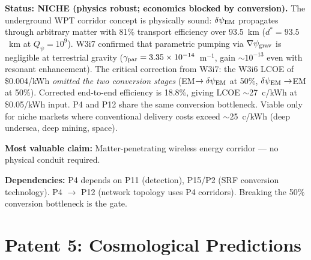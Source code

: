 \documentclass[11pt]{article}
\newcommand{\ee}[1]{\times 10^{#1}}
\newcommand{\psigrav}{\psi_{\rm grav}}
\newcommand{\dpsiEM}{\delta\psi_{\rm EM}}
\begin{document}
\begin{tcolorbox}[colback=yellow!5!white, colframe=yellow!60!black,
  title=\textbf{P4: NICHE --- Resource Allocation: 2/5}]
\textbf{Status: NICHE (physics robust; economics blocked by conversion).}
The underground WPT corridor concept is physically sound: $\dpsiEM$
propagates through arbitrary matter with 81\% transport efficiency over
93.5~km ($d^* = 93.5$~km at $Q_\psi = 10^9$). W3i7 confirmed that
parametric pumping via $\nabla\psigrav$ is negligible at terrestrial
gravity ($\gamma_{\rm par} = 3.35\ee{-14}$~m$^{-1}$, gain $\sim 10^{-13}$
even with resonant enhancement). The critical correction from W3i7:
the W3i6 LCOE of \$0.004/kWh \emph{omitted the two conversion stages}
(EM$\to\dpsiEM$ at 50\%, $\dpsiEM\to$EM at 50\%). Corrected end-to-end
efficiency is 18.8\%, giving LCOE $\sim$27~c/kWh at \$0.05/kWh input.
P4 and P12 share the same conversion bottleneck. Viable only for
niche markets where conventional delivery costs exceed $\sim$25~c/kWh
(deep undersea, deep mining, space).

\textbf{Most valuable claim:} Matter-penetrating wireless energy
corridor --- no physical conduit required.

\textbf{Dependencies:} P4 depends on P11 (detection), P15/P2 (SRF
conversion technology). P4 $\to$ P12 (network topology uses P4
corridors). Breaking the 50\% conversion bottleneck is the gate.
\end{tcolorbox}

\section{Patent 5: Cosmological Predictions}
\label{sec:P5}
\end{document}
